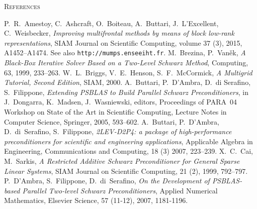 \begin{thebibliography}{99}
         {\textsc{References}}

%
P.~R.~Amestoy, C.~Ashcraft, O.~Boiteau, A.~Buttari, J.~L'Excellent, C.~Weisbecker,
{\em Improving multifrontal methods by means of block low-rank representations},
SIAM Journal on Scientific Computing, volume 37 (3), 2015, A1452--A1474.
See also {\tt http://mumps.enseeiht.fr}.
%
M.~Brezina, P.~Van\v{e}k,
{\em A Black-Box Iterative Solver Based on a Two-Level Schwarz Method},
Computing, 63, 1999, 233--263.
%
W.~L.~Briggs, V.~E.~Henson, S.~F.~McCormick,
{\em A Multigrid Tutorial, Second Edition},
SIAM, 2000.
%
A.~Buttari, P.~D'Ambra, D.~di Serafino, S.~Filippone,
{\em Extending PSBLAS to Build Parallel Schwarz Preconditioners},
in J.~Dongarra, K.~Madsen, J.~Wasniewski, editors,
Proceedings of PARA~04 Workshop on State of the Art
in Scientific Computing, Lecture Notes in Computer Science,
Springer, 2005, 593--602.
%
A.~Buttari, P.~D'Ambra, D.~di~Serafino, S.~Filippone,
{\em 2LEV-D2P4: a package of high-performance preconditioners
for scientific and engineering applications},
Applicable Algebra in Engineering, Communications and Computing,
18 (3) 2007, 223--239.
%
X.~C.~Cai, M.~Sarkis,
{\em A Restricted Additive Schwarz Preconditioner for General Sparse Linear Systems},
SIAM Journal on Scientific Computing, 21 (2), 1999, 792--797.
%
%
%
P.~D'Ambra, S.~Filippone,  D.~di~Serafino,
{\em On the Development of PSBLAS-based Parallel Two-level Schwarz Preconditioners},
Applied Numerical Mathematics, Elsevier Science,
57 (11-12), 2007, 1181-1196.
%

\end{thebibliography}

